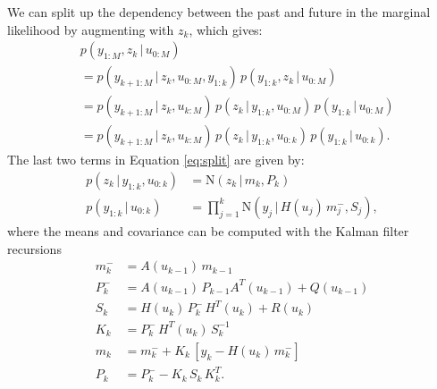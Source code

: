 \documentclass[twocolumn]{autart}    %
\begin{document}
We can split up the dependency between the past and future in the
marginal likelihood by augmenting with $z_k$, which gives:
%
\begin{equation}
\begin{split}
  &p(y_{1:M},z_k\,|\,u_{0:M}) \\
  &=
    p(y_{k+1:M}\,|\,z_k,u_{0:M},y_{1:k}) \,
    p(y_{1:k},z_k \,|\, u_{0:M}) \\
  &=
    p(y_{k+1:M}\,|\,z_k,u_{k:M}) \,
    p(z_k \,|\, y_{1:k},u_{0:M}) \,
    p(y_{1:k} \,|\, u_{0:M}) \\
  &=
    p(y_{k+1:M}\,|\,z_k,u_{k:M}) \,
    p(z_k \,|\, y_{1:k},u_{0:k}) \,
    p(y_{1:k} \,|\, u_{0:k}).
\end{split}
\label{eq:split}
\end{equation}
%
The last two terms in Equation \eqref{eq:split} are given by:
%
\begin{equation}
\begin{split}
  p(z_k \,|\,y_{1:k},u_{0:k})
  &= \mathrm{N}(z_k\,|\,m_k,P_k) \\
  p(y_{1:k}\,|\,u_{0:k})
  &= \prod_{j=1}^k \mathrm{N}(y_j\,|\,H(u_j) \, m^-_j,S_j),
\end{split}
\end{equation}
%
where the means and covariance can be computed
with the Kalman filter recursions
%
\begin{equation}
\begin{split}
 m^-_k &= A(u_{k-1}) \, m_{k-1} \\
 P^-_k &= A(u_{k-1}) \, P_{k-1} A^T(u_{k-1}) + Q(u_{k-1}) \\
   S_k &= H(u_{k}) \, P^-_k \, H^T(u_{k}) + R(u_{k}) \\
   K_k &= P^-_k \, H^T(u_{k}) \, S_k^{-1} \\
   m_k &= m^-_k + K_k \, [y_k - H(u_{k}) \, m^-_k] \\
   P_k &= P^-_k - K_k \, S_k \, K_k^T.
\end{split}
\end{equation}
\end{document}
